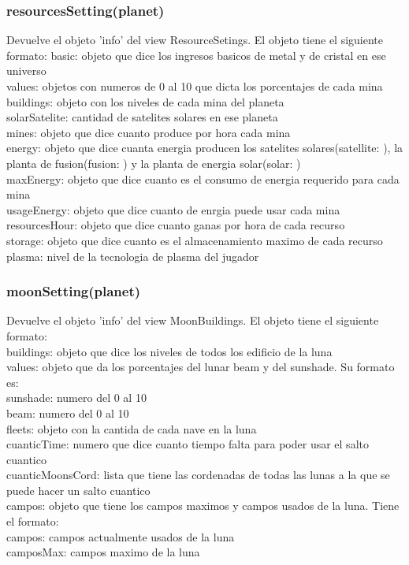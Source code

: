 \documentclass{article}
\newcommand\tab[1][1cm]{\hspace*{#1}}
\begin{document}
        \subsubsection{resourcesSetting(planet)}
            Devuelve el objeto 'info' del view ResourceSetings. El objeto tiene el siguiente formato:
            \tab basic: objeto que dice los ingresos basicos de metal y de cristal en ese universo\\
            \tab values: objetos con numeros de 0 al 10 que dicta los porcentajes de cada mina\\
            \tab buildings: objeto con los niveles de cada mina del planeta\\
            \tab solarSatelite: cantidad de satelites solares en ese planeta\\
            \tab mines: objeto que dice cuanto produce por hora cada mina\\
            \tab energy: objeto que dice cuanta energia producen los satelites solares(satellite: ), la planta de fusion(fusion: ) y la planta de energia solar(solar: )\\
            \tab maxEnergy: objeto que dice cuanto es el consumo de energia requerido para cada mina\\
            \tab usageEnergy: objeto que dice cuanto de enrgia puede usar cada mina\\
            \tab resourcesHour: objeto que dice cuanto ganas por hora de cada recurso\\
            \tab storage: objeto que dice cuanto es el almacenamiento maximo de cada recurso\\
            \tab plasma: nivel de la tecnologia de plasma del jugador\\
        \subsubsection{moonSetting(planet)}
          Devuelve el objeto 'info' del view MoonBuildings. El objeto tiene el siguiente formato:\\
          \tab buildings: objeto que dice los niveles de todos los edificio de la luna\\
          \tab values: objeto que da los porcentajes del lunar beam y del sunshade. Su formato es:\\
          \tab\tab sunshade: numero del 0 al 10\\
          \tab\tab beam: numero del 0 al 10\\
          \tab fleets: objeto con la cantida de cada nave en la luna\\
          \tab cuanticTime: numero que dice cuanto tiempo falta para poder usar el salto cuantico\\
          \tab cuanticMoonsCord: lista que tiene las cordenadas de todas las lunas a la que se puede hacer un salto cuantico\\
          \tab campos: objeto que tiene los campos maximos y campos usados de la luna. Tiene el formato:\\
          \tab\tab campos: campos actualmente usados de la luna\\
          \tab\tab camposMax: campos maximo de la luna\\
\end{document}
